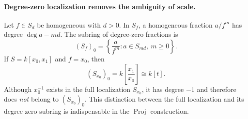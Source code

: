\paragraph{Degree-zero localization removes the ambiguity of scale.}
Let \(f\in S_d\) be homogeneous with \(d>0\). In \(S_f\), a
homogeneous fraction \(a/f^m\) has degree \(\deg a-md\).
The subring of degree-zero fractions is
\[
 (S_f)_0=\left\{\frac{a}{f^m}:a\in S_{md},\ m\geq0\right\}.
\]
If \(S=k[x_0,x_1]\) and \(f=x_0\), then
\[
 (S_{x_0})_0=k\!\left[\frac{x_1}{x_0}\right]\cong k[t].
\]
Although \(x_0^{-1}\) exists in the full localization \(S_{x_0}\),
it has degree \(-1\) and therefore does \emph{not} belong to
\((S_{x_0})_0\). This distinction between the full localization
and its degree-zero subring is indispensable in the \(\operatorname{Proj}\)
construction.
